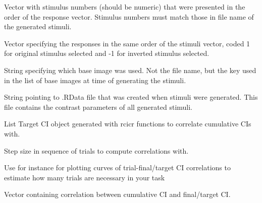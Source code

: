 \documentclass[letterpaper]{book}
\begin{document}
\begin{Arguments}
\begin{ldescription}
\item[\code{stimuli}] Vector with stimulus numbers (should be numeric) that were presented in the order of the response vector. Stimulus numbers must match those in file name of the generated stimuli.

\item[\code{responses}] Vector specifying the responses in the same order of the stimuli vector, coded 1 for original stimulus selected and -1 for inverted stimulus selected.

\item[\code{baseimage}] String specifying which base image was used. Not the file name, but the key used in the list of base images at time of generating the stimuli.

\item[\code{rdata}] String pointing to .RData file that was created when stimuli were generated. This file contains the contrast parameters of all generated stimuli.

\item[\code{targetci}] List Target CI object generated with rcicr functions to correlate cumulative CIs with.

\item[\code{step}] Step size in sequence of trials to compute correlations with.
\end{ldescription}
\end{Arguments}
%
\begin{Details}
Use for instance for plotting curves of trial-final/target CI correlations to estimate how many trials are necessary in your task
\end{Details}
%
\begin{Value}
Vector containing correlation between cumulative CI and final/target CI.
\end{Value}
%
\begin{Examples}
\end{Examples}
\end{document}

